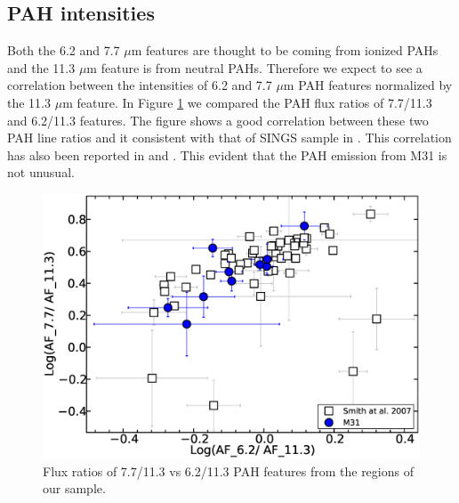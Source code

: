 
\subsection{PAH intensities}

Both the 6.2 and 7.7 $\mu$m features are thought to be coming from ionized PAHs and the 11.3 $\mu$m feature is from neutral PAHs. Therefore we expect to see a correlation between the intensities of 6.2 and 7.7 $\mu$m PAH features normalized by the 11.3 $\mu$m feature. In Figure \ref{PAHlines} we compared the PAH flux ratios of 7.7/11.3  and 6.2/11.3 features. The figure shows a good correlation between these two PAH line ratios and it consistent with that of SINGS sample in \citet{Smith:2007lr}. This correlation has also been reported in \citet{Galliano2008} and \citet{Vermeij2002}. This evident that the PAH emission from M31 is not unusual. 

\begin{figure}
\centering
\includegraphics[scale = 0.25]{./SINGSnMy.eps}
\caption{ Flux ratios of 7.7/11.3 vs 6.2/11.3 PAH features from the regions of our sample.}
\label{PAHlines}
\end{figure}

